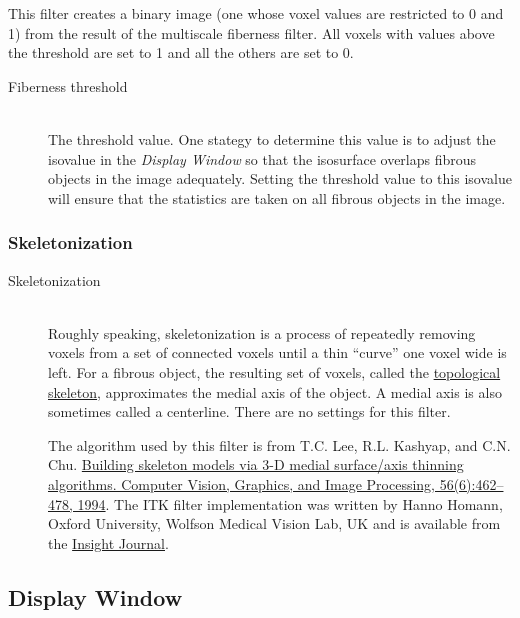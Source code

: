 \documentclass[11pt,titlepage,twoside]{article}
\begin{document}
This filter creates a binary image (one whose voxel values are restricted to 0 and 1) from the result of the multiscale fiberness filter. All voxels with values above the threshold are set to 1 and all the others are set to 0.

\begin{description}

\item[Fiberness threshold] \hfill \\
The threshold value. One stategy to determine this value is to adjust the isovalue in the \emph{Display Window} so that the isosurface overlaps fibrous objects in the image adequately. Setting the threshold value to this isovalue will ensure that the statistics are taken on all fibrous objects in the image.

\end{description}

\subsubsection{Skeletonization}

\begin{description}

\item[Skeletonization] \hfill \\
Roughly speaking, skeletonization is a process of repeatedly removing voxels from a set of connected voxels until a thin ``curve'' one voxel wide is left. For a fibrous object, the resulting set of voxels, called the \href{http://en.wikipedia.org/wiki/Topological_skeleton}{topological skeleton}, approximates the medial axis of the object. A medial axis is also sometimes called a centerline. There are no settings for this filter.

The algorithm used by this filter is from T.C. Lee, R.L. Kashyap, and C.N. Chu. \href{http://dx.doi.org/10.1006/cgip.1994.1042}{Building skeleton models via 3-D medial surface/axis thinning algorithms. Computer Vision, Graphics, and Image Processing, 56(6):462--478, 1994}. The ITK filter implementation was written by Hanno Homann, Oxford University, Wolfson Medical Vision Lab, UK 
and is available from the \href{http://www.insight-journal.org/browse/publication/181}{Insight Journal}.

\end{description}

\subsection{Display Window}
\end{document}
